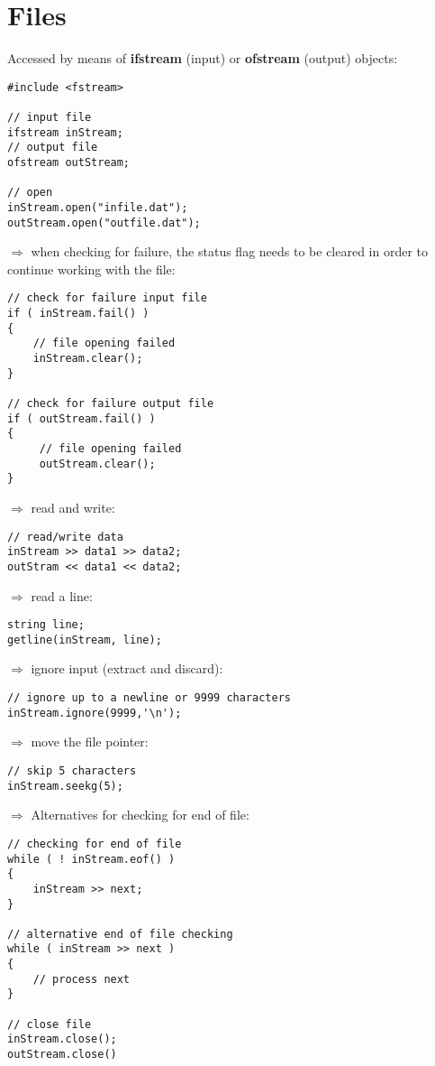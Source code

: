 \documentclass[10pt]{article}
\begin{document}
\section{Files}
\small
Accessed by means of \textbf{ifstream} (input) or
\textbf{ofstream} (output) objects:
\begin{lstlisting}
#include <fstream>

// input file
ifstream inStream;
// output file
ofstream outStream;

// open
inStream.open("infile.dat");
outStream.open("outfile.dat");
\end{lstlisting}
$\Rightarrow$ when checking for failure, the status flag needs to be cleared
in order to continue working with the file:
\begin{lstlisting}
// check for failure input file
if ( inStream.fail() )
{
    // file opening failed
    inStream.clear();
}

// check for failure output file
if ( outStream.fail() )
{
     // file opening failed
     outStream.clear();
}
\end{lstlisting}
$\Rightarrow$ read and write:
\begin{lstlisting}
// read/write data
inStream >> data1 >> data2;
outStram << data1 << data2;
\end{lstlisting}
$\Rightarrow$ read a line:
\begin{lstlisting}
string line;
getline(inStream, line);
\end{lstlisting}
$\Rightarrow$ ignore input (extract and discard):
\begin{lstlisting}
// ignore up to a newline or 9999 characters
inStream.ignore(9999,'\n');
\end{lstlisting}
$\Rightarrow$ move the file pointer:
\begin{lstlisting}
// skip 5 characters
inStream.seekg(5);
\end{lstlisting}
$\Rightarrow$ Alternatives for checking for end of file:
\begin{lstlisting}
// checking for end of file
while ( ! inStream.eof() )
{
    inStream >> next;
}

// alternative end of file checking
while ( inStream >> next )
{
    // process next
}

// close file
inStream.close();
outStream.close()
\end{lstlisting}
%
%
\end{document}
